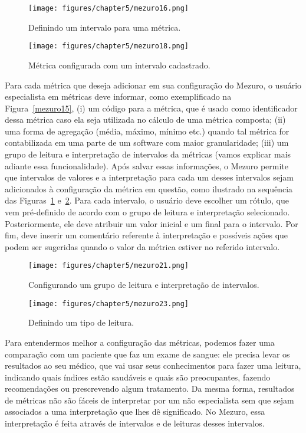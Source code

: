 \begin{figure}[!h]
\centering
\texttt{[image: figures/chapter5/mezuro16.png]}
\caption{Definindo um intervalo para uma métrica.}
\label{mezuro16}
\end{figure}


\begin{figure}[!h]
\centering
\texttt{[image: figures/chapter5/mezuro18.png]}
\caption{Métrica configurada com um intervalo cadastrado.}
\label{mezuro18}
\end{figure}

Para cada métrica que deseja adicionar em sua configuração do Mezuro, 
o usuário especialista em métricas deve informar, como
exemplificado na Figura~\ref{mezuro15},
%
(i) um código para a métrica, que é usado como identificador dessa métrica
caso ela seja utilizada no cálculo de uma métrica composta;
%
(ii) uma forma de agregação (média, máximo, mínimo etc.) quando tal
métrica for contabilizada em uma parte de um software com maior granularidade;
%
(iii) um grupo de leitura e interpretação de intervalos da métricas
(vamos explicar mais adiante essa funcionalidade).
%
Após salvar essas informações, o Mezuro permite que intervalos de valores
e a interpretação para cada um desses intervalos sejam adicionados à
configuração da métrica em questão, como ilustrado na sequência das
Figuras~\ref{mezuro16} e~\ref{mezuro18}.
%
Para cada intervalo, o usuário deve escolher um rótulo, que vem pré-definido
de acordo com o grupo de leitura e interpretação selecionado. Posteriormente,
ele deve atribuir um valor inicial e um final para o intervalo.
%
Por fim, deve inserir um comentário referente à interpretação e possíveis ações
que podem ser sugeridas quando o valor da métrica estiver no referido intervalo.

\begin{figure}[!h]
\centering
\texttt{[image: figures/chapter5/mezuro21.png]}
\caption{Configurando um grupo de leitura e interpretação de intervalos.}
\label{mezuro21}
\end{figure}

\begin{figure}[!h]
\centering
\texttt{[image: figures/chapter5/mezuro23.png]}
\caption{Definindo um tipo de leitura.}
\label{mezuro23}
\end{figure}


Para entendermos melhor a configuração das métricas, podemos fazer uma comparação
com um paciente que faz um exame de sangue: ele precisa levar os resultados ao
seu médico, que vai usar seus conhecimentos para fazer uma leitura, indicando
quais índices estão saudáveis e quais são preocupantes, fazendo recomendações
ou prescrevendo algum tratamento.
%
Da mesma forma, resultados de métricas não são fáceis de interpretar por um
não especialista sem que sejam associados a uma interpretação que lhes dê
significado.
%
No Mezuro, essa interpretação é feita através de intervalos e de leituras desses
intervalos.

